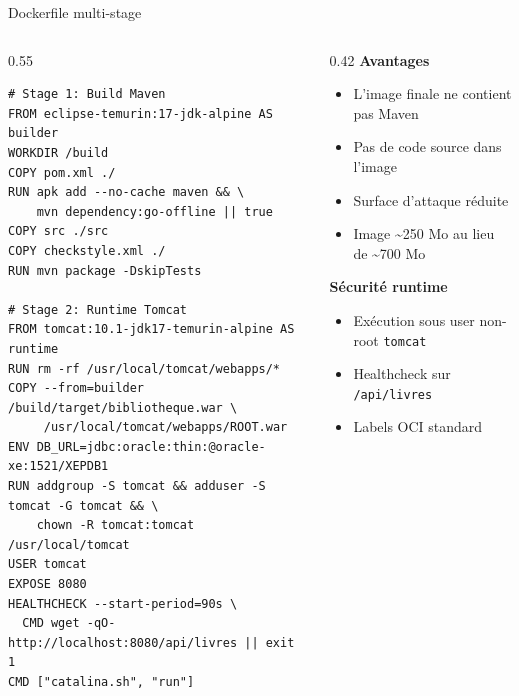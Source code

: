 \documentclass[aspectratio=169,12pt]{beamer}
\begin{document}
\begin{frame}[fragile]{Dockerfile multi-stage}
  \begin{columns}
    \begin{column}{0.55\textwidth}
      \begin{lstlisting}
# Stage 1: Build Maven
FROM eclipse-temurin:17-jdk-alpine AS builder
WORKDIR /build
COPY pom.xml ./
RUN apk add --no-cache maven && \
    mvn dependency:go-offline || true
COPY src ./src
COPY checkstyle.xml ./
RUN mvn package -DskipTests

# Stage 2: Runtime Tomcat
FROM tomcat:10.1-jdk17-temurin-alpine AS runtime
RUN rm -rf /usr/local/tomcat/webapps/*
COPY --from=builder /build/target/bibliotheque.war \
     /usr/local/tomcat/webapps/ROOT.war
ENV DB_URL=jdbc:oracle:thin:@oracle-xe:1521/XEPDB1
RUN addgroup -S tomcat && adduser -S tomcat -G tomcat && \
    chown -R tomcat:tomcat /usr/local/tomcat
USER tomcat
EXPOSE 8080
HEALTHCHECK --start-period=90s \
  CMD wget -qO- http://localhost:8080/api/livres || exit 1
CMD ["catalina.sh", "run"]
      \end{lstlisting}
    \end{column}
    \begin{column}{0.42\textwidth}
      \textbf{Avantages}
      \begin{itemize}
        \item L'image finale ne contient pas Maven
        \item Pas de code source dans l'image
        \item Surface d'attaque réduite
        \item Image \textasciitilde 250 Mo au lieu de \textasciitilde 700 Mo
      \end{itemize}

      \vspace{0.5em}
      \textbf{Sécurité runtime}
      \begin{itemize}
        \item Exécution sous user non-root \texttt{tomcat}
        \item Healthcheck sur \texttt{/api/livres}
        \item Labels OCI standard
      \end{itemize}
    \end{column}
  \end{columns}
\end{frame}
\end{document}
